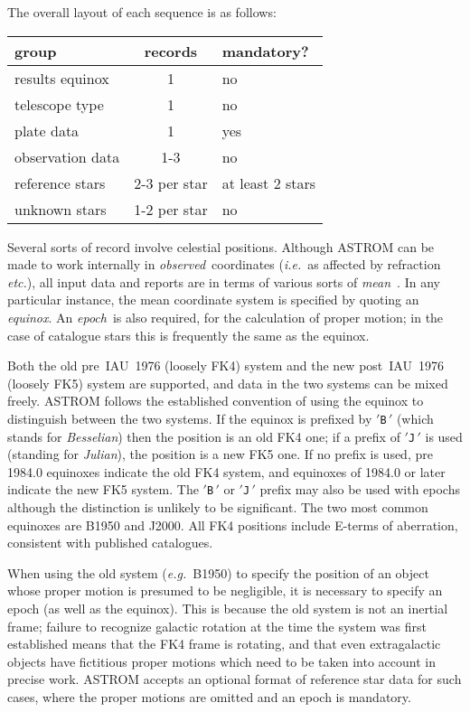 \goodbreak
The overall layout of each sequence is as follows:

\begin{center}
\begin{tabular}{|l|c|l|}
\hline
group & records & mandatory? \\
\hline
results equinox  &   1           & no \\
telescope type   &   1           & no \\
plate data       &   1           & yes \\
observation data &   1-3         & no \\
reference stars  &  2-3 per star & at least 2 stars \\
unknown stars    &  1-2 per star & no \\
\hline
\end{tabular}
\end{center}

Several sorts of record involve celestial positions.  Although
ASTROM can be made to work internally in {\it observed}\,
coordinates ({\it i.e.}\ as affected by refraction {\it etc.}),
all input data and reports are in terms of various sorts of
{\it mean}\, \radec.  In any particular instance, the mean coordinate
system is specified by quoting an {\it equinox}.  An
{\it epoch}\, is also required, for the calculation of
proper motion;  in the case of catalogue stars
this is frequently the same as the equinox.

Both the old pre~IAU~1976 (loosely FK4) system and the
new post~IAU~1976 (loosely FK5) system are supported, and
data in the two systems can be mixed freely.  ASTROM
follows the established convention of using the equinox to
distinguish between the two systems.  If the equinox is
prefixed by $'${\tt B}$\,'$ (which stands for
{\it Besselian}) then the position
is an old FK4 one;  if a prefix of $'${\tt J}$\,'$ is used (standing for
{\it Julian}), the position is a new FK5 one.  If no prefix is used,
pre 1984.0 equinoxes indicate the old FK4 system, and equinoxes
of 1984.0 or later indicate the new FK5 system.  The $'${\tt B}$\,'$
or $'${\tt J}$\,'$
prefix may also be used with epochs although the distinction is
unlikely to be significant.  The two most common equinoxes are
B1950 and J2000.  All FK4 positions include E-terms of aberration,
consistent with published catalogues.

When using the old system ({\it e.g.}\ B1950)
to specify the position of an object whose
proper motion is presumed to be
negligible, it is necessary to specify an epoch (as well as
the equinox).  This is because the old system is not
an inertial frame; failure to recognize galactic rotation
at the time the system was first established means that the
FK4 frame is rotating, and that even extragalactic
objects have fictitious proper motions which need to be taken
into account in precise work.  ASTROM accepts an optional
format of reference star data for such cases, where the
proper motions are omitted and an epoch is mandatory.

